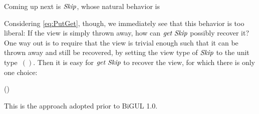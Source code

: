 Coming up next is \ensuremath{\Conid{Skip}}, whose natural behavior is
\begin{hscode}\SaveRestoreHook
{}%
%
\>[B]{}\;\;\;\mathrel{=}\;\<[E]%
\ColumnHook
\end{hscode}\resethooks
Considering \ref{eq:PutGet}, though, we immediately see that this behavior is too liberal:
If the view is simply thrown away, how can \ensuremath{\Varid{get}\;\Conid{Skip}} possibly recover it?
One way out is to require that the view is trivial enough such that it can be thrown away and still be recovered, by setting the view type of \ensuremath{\Conid{Skip}} to the unit type~\ensuremath{()}.
Then it is easy for \ensuremath{\Varid{get}\;\Conid{Skip}} to recover the view, for which there is only one choice:
\begin{hscode}\SaveRestoreHook
{}%
%
\>[B]{}\;\;\mathrel{=}\;(){}\<[E]%
\ColumnHook
\end{hscode}\resethooks
This is the approach adopted prior to BiGUL 1.0.

